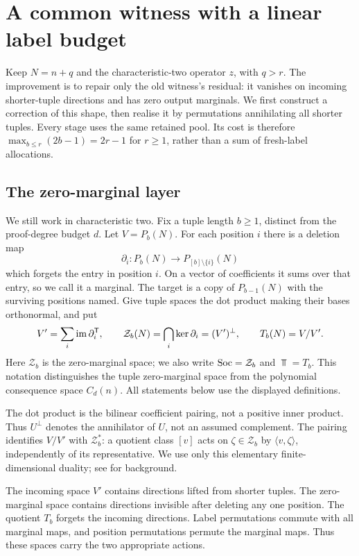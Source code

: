 \documentclass[11pt,a4paper]{article}
\theoremstyle{definition}\newtheorem{definition}[theorem]{Definition}
\theoremstyle{remark}\newtheorem{remark}[theorem]{Remark}
\begin{document}
\section{A common witness with a linear label budget}\label{sec:linear-construction}
Keep $N=n+q$ and the characteristic-two operator $z$, with $q>r$.
The improvement is to repair only the old witness's residual: it
vanishes on incoming shorter-tuple directions and has zero output
marginals. We first construct a correction of this shape, then
realise it by permutations annihilating all shorter tuples. Every
stage uses the same retained pool. Its cost is therefore
$\max_{b\le r}(2b-1)=2r-1$ for $r\ge1$, rather than a sum of
fresh-label allocations.

\subsection{The zero-marginal layer}\label{sec:layers}
We still work in characteristic two. Fix a tuple length $b\ge1$, distinct from the proof-degree budget $d$. Let $V=P_b(N)$. For each position $i$ there is a deletion map
\[\partial_i:P_b(N)\longrightarrow P_{[b]\setminus\{i\}}(N)
\]
which forgets the entry in position $i$. On a vector of coefficients it sums over that entry, so we call it a marginal. The target is a copy of $P_{b-1}(N)$ with the surviving positions named. Give tuple spaces the dot product making their bases orthonormal, and put
\begin{equation}\label{eq:anatomy}
V'=\sum_i\operatorname{im}\partial_i^{\mathsf T},\qquad
\mathcal Z_b(N)=\bigcap_i\ker\partial_i=(V')^\perp,\qquad T_b(N)=V/V'.
\end{equation}
Here $\mathcal Z_b$ is the zero-marginal space; we also write $\operatorname{Soc}=\mathcal Z_b$ and $\Top=T_b$. This notation distinguishes the tuple zero-marginal space from the
polynomial consequence space $C_d(n)$. All statements below use the
displayed definitions.

The dot product is the bilinear coefficient pairing, not a positive
inner product. Thus $U^\perp$ denotes the annihilator of $U$, not an
assumed complement. The pairing identifies $V/V'$ with
$\mathcal Z_b^*$: a quotient class $[v]$ acts on $\zeta\in\mathcal Z_b$
by $\langle v,\zeta\rangle$, independently of its representative.
We use only this elementary finite-dimensional duality; see
\cite{LangAlgebra} for background.

The incoming space $V'$ contains directions lifted from shorter tuples. The zero-marginal space contains directions invisible after deleting any one position. The quotient $T_b$ forgets the incoming directions. Label permutations commute with all marginal maps, and position permutations permute the marginal maps. Thus these spaces carry the two appropriate actions.
\end{document}
